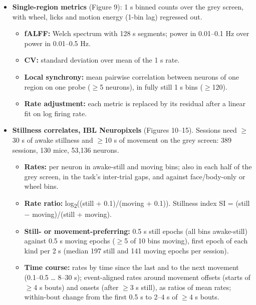 \documentclass[10pt,a4paper]{article}
\begin{document}
\begin{itemize}
\begin{itemize}
\item \textbf{Coupling:} Fisher z of the pair correlation, minus the mean z of cortical (and CA1) pairs in the same 0.5 mm 3-D distance bin and probe relation. The mesoscope uses ML--AP distance with hemispheres folded.
\item \textbf{Classes:} DMN--DMN, DMN--other and other--other pairs.
\item \textbf{Rest-preference network:} cortical regions split into terciles of grey-screen RI in one half of the mice, with coupling evaluated in the other half.
\end{itemize}
\item \textbf{Single-region metrics} (Figure 9): 1 s binned counts over the grey screen, with wheel, licks and motion energy (1-bin lag) regressed out. 
\begin{itemize}
\item \textbf{fALFF:} Welch spectrum with 128 s segments; power in 0.01--0.1 Hz over power in 0.01--0.5 Hz.
\item \textbf{CV:} standard deviation over mean of the 1 s rate.
\item \textbf{Local synchrony:} mean pairwise correlation between neurons of one region on one probe ($\geq$5 neurons), in fully still 1 s bins ($\geq$120).
\item \textbf{Rate adjustment:} each metric is replaced by its residual after a linear fit on log firing rate.
\end{itemize}
\item \textbf{Stillness correlates, IBL Neuropixels} (Figures 10--15). Sessions need $\geq$30 s of awake stillness and $\geq$10 s of movement on the grey screen: 389 sessions, 130 mice, 53,136 neurons. 
\begin{itemize}
\item \textbf{Rates:} per neuron in awake-still and moving bins; also in each half of the grey screen, in the task's inter-trial gaps, and against face/body-only or wheel bins.
\item \textbf{Rate ratio:} log\textsubscript{2}((still + 0.1)/(moving + 0.1)). Stillness index SI = (still $-$ moving)/(still + moving).
\item \textbf{Still- or movement-preferring:} 0.5 s still epochs (all bins awake-still) against 0.5 s moving epochs ($\geq$5 of 10 bins moving), first epoch of each kind per 2 s (median 197 still and 141 moving epochs per session).
\item \textbf{Time course:} rates by time since the last and to the next movement (0.1--0.5 \ldots{} 8--30 s); event-aligned rates around movement offsets (starts of $\geq$4 s bouts) and onsets (after $\geq$3 s still), as ratios of mean rates; within-bout change from the first 0.5 s to 2--4 s of $\geq$4 s bouts.

\end{itemize}
\end{itemize}
\end{document}
